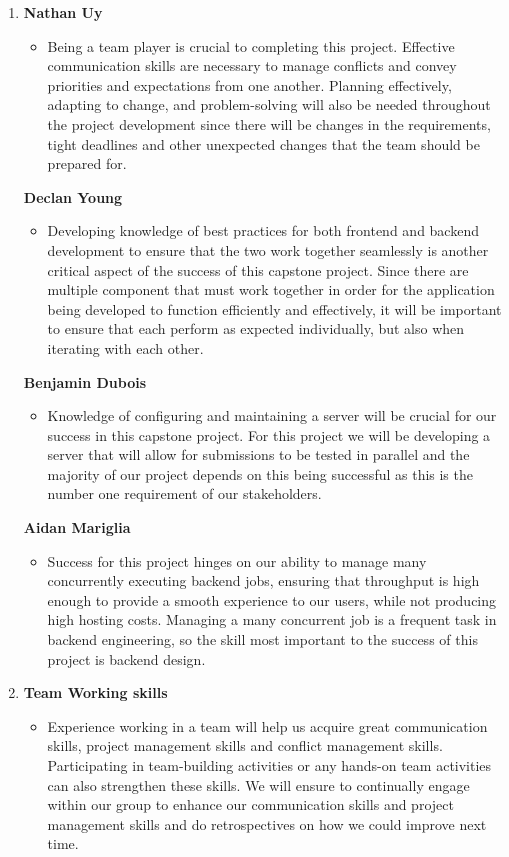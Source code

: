 \documentclass[12pt]{article}
\begin{document}
\begin{enumerate}
  \item \textbf{Nathan Uy}
\begin{itemize}
    \item Being a team player is crucial to completing this project. Effective communication skills are necessary to manage conflicts and convey priorities and expectations from one another. Planning effectively, adapting to change, and problem-solving will also be needed throughout the project development since there will be changes in the requirements, tight deadlines and other unexpected changes that the team should be prepared for.
\end{itemize} 
\textbf{Declan Young}
\begin{itemize}
    \item Developing knowledge of best practices for both frontend and backend development to ensure that the two work together seamlessly is another critical aspect of the success of this capstone project. Since there are multiple component that must work together in order for the application being developed to function efficiently and effectively, it will be important to ensure that each perform as expected individually, but also when iterating with each other. 
\end{itemize} 
\textbf{Benjamin Dubois}
\begin{itemize}
    \item Knowledge of configuring and maintaining a server will be crucial for our success in this capstone project. For this project we will be developing a server that will allow for submissions to be tested in parallel and the majority of our project depends on this being successful as this is the number one requirement of our stakeholders.
\end{itemize}
\textbf{Aidan Mariglia}
\begin{itemize}
    \item Success for this project hinges on our ability to manage many concurrently executing backend jobs, ensuring that throughput is high enough to provide a smooth experience to our users, while not producing high hosting costs. Managing a many concurrent job is a frequent task in backend engineering, so the skill most important to the success of this project is backend design.
\end{itemize}
\item \textbf{Team Working skills}
\begin{itemize}
\item Experience working in a team will help us acquire great communication skills, project management skills and conflict management skills. Participating in team-building activities or any hands-on team activities can also strengthen these skills. We will ensure to continually engage within our group to enhance our communication skills and project management skills and do retrospectives on how we could improve next time.

\end{itemize}
\end{enumerate}
\end{document}
